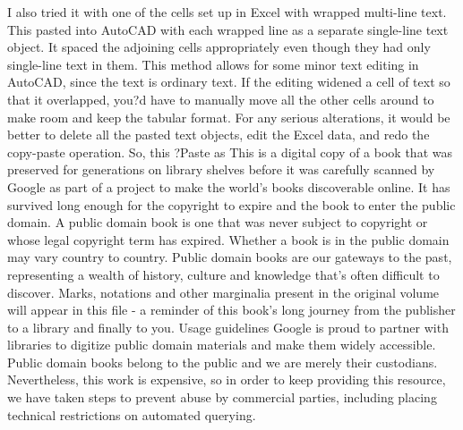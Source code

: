 \documentclass[a4paper]{article}
\begin{document}
{I also tried it with one of the cells set up in Excel with wrapped multi-line text. This pasted into AutoCAD with each wrapped line as a separate single-line text object. It spaced the adjoining cells appropriately even though they had only single-line text in them.
This method allows for some minor text editing in AutoCAD, since the text is ordinary text. If the editing widened a cell of text so that it overlapped, you?d have to manually move all the other cells around to make room and keep the tabular format. For any serious alterations, it would be better to delete all the pasted text objects, edit the Excel data, and redo the copy-paste operation.
So, this ?Paste as %
This is a digital copy of a book that was preserved for generations on library shelves before it was carefully scanned by Google as part of a project 
to make the world's books discoverable online. 
It has survived long enough for the copyright to expire and the book to enter the public domain. A public domain book is one that was never subject 
to copyright or whose legal copyright term has expired. Whether a book is in the public domain may vary country to country. Public domain books 
are our gateways to the past, representing a wealth of history, culture and knowledge that's often difficult to discover. 
Marks, notations and other marginalia present in the original volume will appear in this file - a reminder of this book's long journey from the 
publisher to a library and finally to you. 
Usage guidelines 
Google is proud to partner with libraries to digitize public domain materials and make them widely accessible. Public domain books belong to the 
public and we are merely their custodians. Nevertheless, this work is expensive, so in order to keep providing this resource, we have taken steps to 
prevent abuse by commercial parties, including placing technical restrictions on automated querying. 
}
\end{document}
